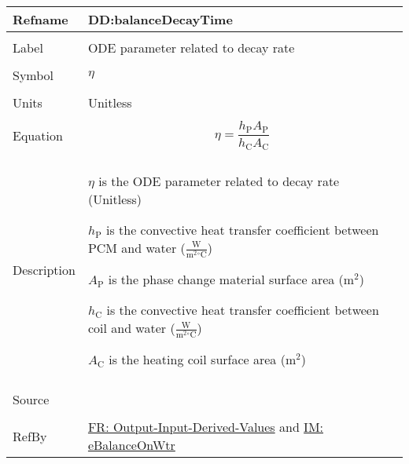\documentclass[12pt]{article}
\begin{document}
\vspace{\baselineskip}
\noindent
\begin{minipage}{\textwidth}
\begin{tabular}{>{\raggedright}p{}>{\raggedright\arraybackslash}p{}}
\toprule \textbf{Refname} & \textbf{DD:balanceDecayTime}
\label{DD:balanceDecayTime}
\\ \midrule \\
Label & ODE parameter related to decay rate
        
\\ \midrule \\
Symbol & $η$
         
\\ \midrule \\
Units & Unitless
        
\\ \midrule \\
Equation & \begin{displaymath}
           η=\frac{{h_{\text{P}}} {A_{\text{P}}}}{{h_{\text{C}}} {A_{\text{C}}}}
           \end{displaymath}
\\ \midrule \\
Description & \begin{symbDescription}
              \item{$η$ is the ODE parameter related to decay rate (Unitless)}
              \item{${h_{\text{P}}}$ is the convective heat transfer coefficient between PCM and water ($\frac{\text{W}}{\text{m}^{2}{}^{\circ}\text{C}}$)}
              \item{${A_{\text{P}}}$ is the phase change material surface area (${\text{m}^{2}}$)}
              \item{${h_{\text{C}}}$ is the convective heat transfer coefficient between coil and water ($\frac{\text{W}}{\text{m}^{2}{}^{\circ}\text{C}}$)}
              \item{${A_{\text{C}}}$ is the heating coil surface area (${\text{m}^{2}}$)}
              \end{symbDescription}
\\ \midrule \\
Source & \cite{koothoor2013}
         
\\ \midrule \\
RefBy & \hyperref[outputInputDerivVals]{FR: Output-Input-Derived-Values} and \hyperref[IM:eBalanceOnWtr]{IM: eBalanceOnWtr}
        
\\ \bottomrule
\end{tabular}
\end{minipage}
\end{document}
